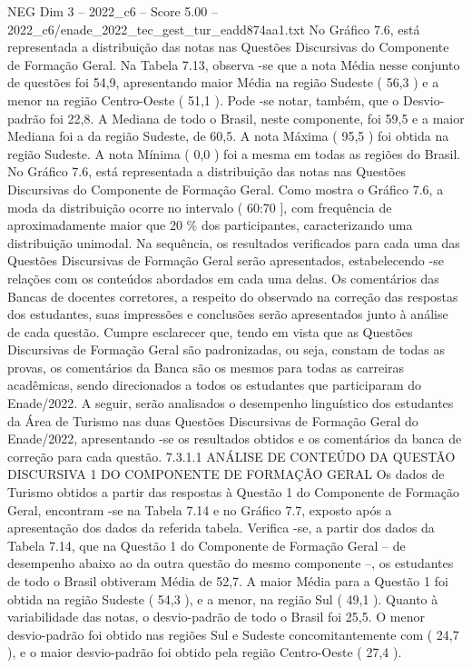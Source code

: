 \begin{textsample}{NEG Dim 3 – 2022\_c6 – Score 5.00 – 2022\_c6/enade\_2022\_tec\_gest\_tur\_eadd874aa1.txt}
No Gráfico 7.6, está representada a distribuição das notas nas Questões Discursivas do Componente de Formação Geral.
Na Tabela 7.13, observa -se que a nota Média nesse conjunto de questões foi 54,9, apresentando maior Média na região Sudeste ( 56,3 ) e a menor na região Centro-Oeste ( 51,1 ).
Pode -se notar, também, que o Desvio-padrão foi 22,8.
A Mediana de todo o Brasil, neste componente, foi 59,5 e a maior Mediana foi a da região Sudeste, de 60,5.
A nota Máxima ( 95,5 ) foi obtida na região Sudeste.
A nota Mínima ( 0,0 ) foi a mesma em todas as regiões do Brasil.
No Gráfico 7.6, está representada a distribuição das notas nas Questões Discursivas do Componente de Formação Geral.
Como mostra o Gráfico 7.6, a moda da distribuição ocorre no intervalo ( 60:70 ], com frequência de aproximadamente maior que 20 \% dos participantes, caracterizando uma distribuição unimodal.
Na sequência, os resultados verificados para cada uma das Questões Discursivas de Formação Geral serão apresentados, estabelecendo -se relações com os conteúdos abordados em cada uma delas.
Os comentários das Bancas de docentes corretores, a respeito do observado na correção das respostas dos estudantes, suas impressões e conclusões serão apresentados junto à análise de cada questão.
Cumpre esclarecer que, tendo em vista que as Questões Discursivas de Formação Geral são padronizadas, ou seja, constam de todas as provas, os comentários da Banca são os mesmos para todas as carreiras acadêmicas, sendo direcionados a todos os estudantes que participaram do Enade/2022.
A seguir, serão analisados o desempenho linguístico dos estudantes da Área de Turismo nas duas Questões Discursivas de Formação Geral do Enade/2022, apresentando -se os resultados obtidos e os comentários da banca de correção para cada questão. 7.3.1.1 ANÁLISE DE CONTEÚDO DA QUESTÃO DISCURSIVA 1 DO COMPONENTE DE FORMAÇÃO GERAL Os dados de Turismo obtidos a partir das respostas à Questão 1 do Componente de Formação Geral, encontram -se na Tabela 7.14 e no Gráfico 7.7, exposto após a apresentação dos dados da referida tabela.
Verifica -se, a partir dos dados da Tabela 7.14, que na Questão 1 do Componente de Formação Geral – de desempenho abaixo ao da outra questão do mesmo componente –, os estudantes de todo o Brasil obtiveram Média de 52,7.
A maior Média para a Questão 1 foi obtida na região Sudeste ( 54,3 ), e a menor, na região Sul ( 49,1 ).
Quanto à variabilidade das notas, o desvio-padrão de todo o Brasil foi 25,5.
O menor desvio-padrão foi obtido nas regiões Sul e Sudeste concomitantemente com ( 24,7 ), e o maior desvio-padrão foi obtido pela região Centro-Oeste ( 27,4 ).

\end{textsample}
